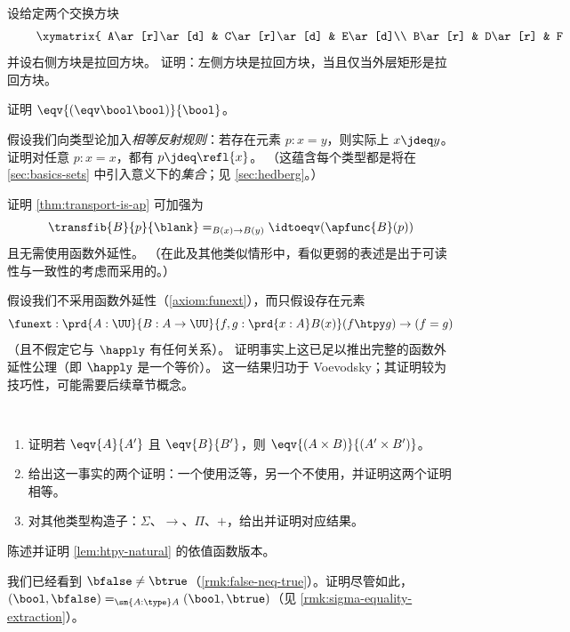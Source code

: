 \begin{ex}\label{ex:pullback-pasting}
  设给定两个交换方块
  \begin{equation*}
    \vcenter{\xymatrix{
        A\ar[r]\ar[d] &
        C\ar[r]\ar[d] &
        E\ar[d]\\
        B\ar[r] &
        D\ar[r] &
        F
      }}
  \end{equation*}
  并设右侧方块是拉回方块。
  证明：左侧方块是拉回方块，当且仅当外层矩形是拉回方块。
\end{ex}

\begin{ex}\label{ex:eqvboolbool}
  证明 $\eqv{(\eqv\bool\bool)}{\bool}$。
\end{ex}

\begin{ex}\label{ex:equality-reflection}
  假设我们向类型论加入\emph{相等反射规则}：若存在元素 $p:x=y$，则实际上 $x\jdeq y$。
  证明对任意 $p:x=x$，都有 $p\jdeq \refl{x}$。
  （这蕴含每个类型都是将在 \cref{sec:basics-sets} 中引入意义下的\emph{集合}；见 \cref{sec:hedberg}。）
\end{ex}

\begin{ex}\label{ex:strengthen-transport-is-ap}
  证明 \cref{thm:transport-is-ap} 可加强为
  \[\transfib{B}{p}{{\blank}} =_{B(x)\to B(y)} \idtoeqv(\apfunc{B}(p))\]
  且无需使用函数外延性。
  （在此及其他类似情形中，看似更弱的表述是出于可读性与一致性的考虑而采用的。）
\end{ex}

\begin{ex}\label{ex:strong-from-weak-funext}
  假设我们不采用函数外延性（\cref{axiom:funext}），而只假设存在元素
  \[ \funext : \prd{A:\UU}{B:A\to \UU}{f,g:\prd{x:A} B(x)} (f\htpy g) \to (f=g) \]
  （且不假定它与 $\happly$ 有任何关系）。
  证明事实上这已足以推出完整的函数外延性公理（即 $\happly$ 是一个等价）。
  这一结果归功于 Voevodsky；其证明较为技巧性，可能需要后续章节概念。
\end{ex}

\begin{ex}\label{ex:equiv-functor-types}\
  \begin{enumerate}
  \item 证明若 $\eqv{A}{A'}$  且 $\eqv{B}{B'}$，则 $\eqv{(A\times B)}{(A'\times B')}$。
  \item 给出这一事实的两个证明：一个使用泛等，另一个不使用，并证明这两个证明相等。
  \item 对其他类型构造子：$\Sigma$、$\to$、$\Pi$、$+$，给出并证明对应结果。
  \end{enumerate}
\end{ex}

\begin{ex}\label{ex:dep-htpy-natural}
  陈述并证明 \cref{lem:htpy-natural} 的依值函数版本。
\end{ex}

\begin{ex}\label{ex:sigma-eq-components-neq}
  我们已经看到 $\bfalse \neq \btrue$（\cref{rmk:false-neq-true}）。证明尽管如此，$(\bool, \bfalse) =_{\sm{A:\type}A} (\bool, \btrue)$（见 \cref{rmk:sigma-equality-extraction}）。
\end{ex}

